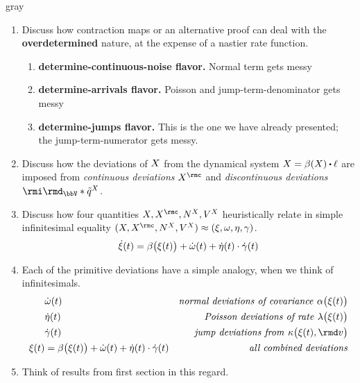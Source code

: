 
\begin{color}{gray}
  \begin{enumerate}
    \item
      Discuss how contraction maps or an alternative proof can deal with the \textbf{overdetermined} nature, at the expense of a nastier rate function.
      \begin{enumerate}
        \item
          \textbf{determine-continuous-noise flavor.}
          Normal term gets messy
        \item
          \textbf{determine-arrivals flavor.}
          Poisson and jump-term-denominator gets messy
        \item
          \textbf{determine-jumps flavor.}
          This is the one we have already presented; the jump-term-numerator gets messy.
      \end{enumerate}
    \item
      Discuss how the deviations of $X$ from the dynamical system $\X = \affDrift(\X) \shortInt \leb$ are imposed from \emph{continuous deviations} $\X^\rmc$ and \emph{discontinuous deviations} $\id_\vecSpace \ast \compensate{\jumpMeas^\X}$.
    \item
      Discuss how four quantities $\X, \X^\rmc, \N^\X, V^\X$ heuristically relate in simple infinitesimal equality $(\X, \X^\rmc, \N^\X, V^\X) \approx (\pathVar, \omega, \eta, \gamma)$.
      \begin{align*}
        \dot{\xi}(t) = \beta\big(\xi(t)\big) + \dot\omega(t) + \dot\eta(t) \cdot \dot\gamma(t)
      \end{align*}
    \item
      Each of the primitive deviations have a simple analogy, when we think of infinitesimals.
      \begin{align*}
        &\dot\omega(t)  & \text{\emph{normal deviations of covariance }} \affDiff\big(\pathVar(t)\big) \\
        &\dot\eta(t) & \text{\emph{Poisson deviations of rate }} \affInt\big(\pathVar(t)\big) \\
        &\dot\gamma(t) & \text{\emph{jump deviations from }} \affDist\big(\pathVar(t), \rmd\markVar\big) \\
        \pathVar(t) &=\affDrift\big(\pathVar(t)\big) + \dot\omega(t) + \dot\eta(t)\cdot\dot\gamma(t) & \text{\emph{all combined deviations}}
      \end{align*}
    \item
      Think of results from first section in this regard.

\end{enumerate}
\end{color}
